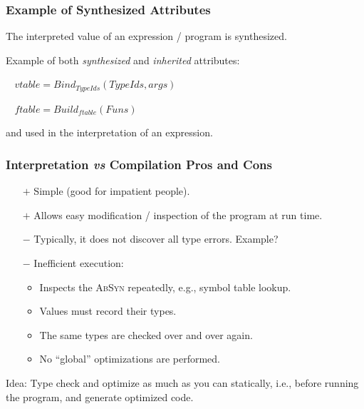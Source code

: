 \documentclass{beamer}
\newcommand{\emp}[1]{\textcolor{DikuRed}{ #1}}
\begin{document}
\begin{frame}[fragile,t]
   \frametitle{Example of Synthesized Attributes}

\bigskip
\bigskip

The interpreted value of an expression / program is synthesized.

\bigskip
\bigskip

Example of both {\em synthesized} and {\em inherited} attributes:

\bigskip

\emp{$~~~~vtable = Bind_{TypeIds} (TypeIds, args)$} 

\smallskip

\emp{$~~~~ftable = Build_{ftable} (Funs)$}

\bigskip

and used in the interpretation of an expression.
\end{frame}


\begin{frame}[fragile,t]
   \frametitle{Interpretation {\em vs} Compilation Pros and Cons}


\noindent\begin{itemize}
\item[$+$] Simple (good for impatient people).\bigskip

\item[$+$] Allows easy modification / inspection of the program at run time.\bigskip

\item[$-$] Typically, it does not discover all type errors. \alert{Example?}\bigskip

\item[$-$] Inefficient execution: \smallskip
        \begin{itemize}
            \item Inspects the \textsc{AbSyn} repeatedly, e.g., symbol table lookup.
            \item Values must record their types.
            \item The same types are checked over and over again.
            \item No ``global'' optimizations are performed.
        \end{itemize}
\end{itemize}

\bigskip

Idea: Type check and optimize as much as you can statically, i.e.,
before running the program, and generate optimized code.


\end{frame}
\end{document}
